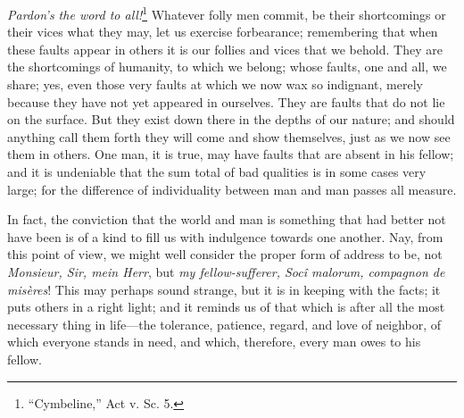\textit{Pardon's the word to all!}\footnote{``Cymbeline,'' Act v. Sc.
5.} Whatever folly men commit, be their shortcomings or their vices
what they may, let us exercise forbearance; remembering that when
these faults appear in others it is our follies and vices that we
behold. They are the shortcomings of humanity, to which we belong;
whose faults, one and all, we share; yes, even those very faults at
which we now wax so indignant, merely because they have not yet
appeared in ourselves. They are faults that do not lie on the surface.
But they exist down there in the depths of our nature; and should
anything call them forth they will come and show themselves, just as
we now see them in others. One man, it is true, may have faults that
are absent in his fellow; and it is undeniable that the sum total of
bad qualities is in some cases very large; for the difference of
individuality between man and man passes all measure.

In fact, the conviction that the world and man is something that had
better not have been is of a kind to fill us with indulgence towards
one another. Nay, from this point of view, we might well consider the
proper form of address to be, not \textit{Monsieur, Sir, mein Herr},
but \textit{my fellow-sufferer, Soc\^i malorum, compagnon de
mis\`eres}! This may perhaps sound strange,  but it is in
keeping with the facts; it puts others in a right light; and it
reminds us of that which is after all the most necessary thing in
life---the tolerance, patience, regard, and love of neighbor, of which
everyone stands in need, and which, therefore, every man owes to his
fellow.


